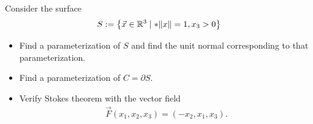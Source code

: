 \documentclass[11pt]{article}
\begin{document}















\begin{exercise} %
    Consider the surface 
    \begin{align*}
        S := \left\{ \vec x \in \bbR^{3} \suchthat* \|x\| = 1, x_3 > 0 \right\}
    \end{align*}
    \begin{itemize}
    \item Find a parameterization of $S$ and find the unit normal corresponding to that parameterization.
    \item Find a parameterization of $C = \partial S$.
    \item Verify Stokes theorem with the vector field 
     \begin{align*}
        \vec F(x_1,x_2,x_3) = ( -x_2, x_1, x_3 ).
     \end{align*}   
    \end{itemize}
\end{exercise}
\end{document}
